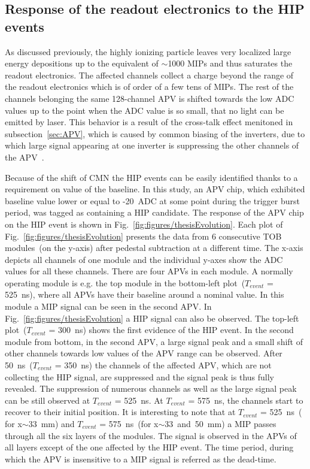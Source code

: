 

\subsection{Response of the readout electronics to the HIP events}

As discussed previously, the highly ionizing particle leaves very localized large energy depositions up to the equivalent of $\sim$1000 MIPs and thus saturates the readout electronics. The affected channels collect a charge beyond the range of the readout electronics which is of order of a few tens of MIPs. The rest of the channels belonging the same 128-channel APV is shifted towards the low ADC values up to the point when the ADC value is so small, that no light can be emitted by laser. This behavior is a result of the cross-talk effect menitoned in subsection~\ref{sec:APV}, which is caused by common biasing of the inverters, due to which large signal appearing at one inverter is suppressing the other channels of the APV~\cite{Bainbridge:2004jc}. 

Because of the shift of CMN the HIP events can be easily identified thanks to a requirement on value of the baseline. In this study, an APV chip, which exhibited baseline value lower or equal to -20~ADC at some point during the trigger burst period, was tagged as containing a  HIP candidate. The response of the APV chip on the HIP event is shown in Fig.~\ref{fig:figures/thesisEvolution}. Each plot of Fig.~\ref{fig:figures/thesisEvolution} presents the data from 6 consecutive TOB modules~(on the y-axis) after pedestal subtraction at a different time. The x-axis depicts all channels of one module and the individual y-axes show the ADC values for all these channels. There are four APVs in each module. A normally operating module is e.g. the top module in the bottom-left plot~($T_{event}$ = 525~ns), where all APVs have their baseline around a nominal value. In this module a MIP signal can be seen in the second APV. In Fig.~\ref{fig:figures/thesisEvolution} a HIP signal can also be observed. The top-left plot~($T_{event}$ = 300~ns) shows the first evidence of the HIP event. In the second module from bottom, in the second APV, a large signal peak and a small shift of other channels towards low values of the APV range can be observed. After 50~ns~($T_{event}$ = 350~ns) the channels of the affected APV, which are not collecting the HIP signal, are suppressed and the signal peak is thus fully revealed. The suppression of numerous channels as well as the large signal peak can be still observed at $T_{event}$ = 525~ns. At $T_{event}$ = 575~ns, the channels start to recover to their initial position. It is interesting to note that at $T_{event}$ = 525~ns~( for x$\sim$33~mm) and $T_{event}$ = 575~ns~(for x$\sim$33~and~50~mm) a MIP passes through all the six layers of the modules. The signal is observed in the APVs of all layers except of the one affected by the HIP event. The time period, during which the APV is insensitive to a MIP signal is referred as the dead-time.

